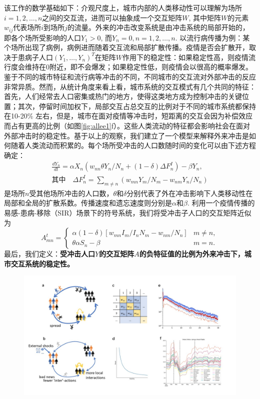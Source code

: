 该工作的数学基础如下：介观尺度上，城市内部的人类移动性可以理解为场所$i = 1,2,\dots,n$之间的交互流，进而可以抽象成一个交互矩阵$W$, 其中矩阵$W$的元素$w_{i j}$代表场所$i$到场所$j$的流量。外来的冲击改变系统是由冲击系统的局部开始的，即各个场所受影响的人口$Y_1>0$, 而$Y_n = 0, n = 1,2,\dots, n$. 以流行病传播为例：某个场所出现了病例，病例进而随着交互流和局部扩散传播。疫情是否会扩散开，取决于患病子人口$(Y_1,\dots,Y_n)^T$在矩阵$W$作用下的稳定性：如果稳定性高，则疫情流行度会维持在$0$附近，即不会爆发；如果稳定性低，则疫情会以很高的概率爆发。鉴于不同的城市特征和流行病等冲击的不同，不同城市的交互流对外部冲击的反应非常异质。然而，从统计角度来看上看，城市系统的交互模式有几个共同的特征：首先，人们经常去人口密集或热门的地方，使得这类地方成为控制冲击的关键位置；其次，停留时间加权下，局部交互占总交互的比例对于不同的城市系统都保持在10-20\% 左右，但是，城市在面对疫情等冲击时，短距离的交互会因为补偿效应而占有更高的比例（如图\ref{fig:allee1}f）。这些人类流动的特征都会影响社会在面对外部冲击时的稳定性。基于以上的观察，我们建立了一个模型来解释外来冲击是如何随着人类流动而积累的。每个场所受冲击的人口数随时间的变化可以由下述方程确定：\begin{equation}
    \begin{split}
        \frac{d Y_n}{d t} = \alpha X_n (w_{nn} \theta Y_n / N_n + (1-\delta) \Delta F_n^I) - \beta Y_n, \\
        \text{其中}\quad \Delta F_n^I = \sum_{m \ne n} (w_{mn} Y_m / N_m - w_{nm} Y_n / N_n)
    \end{split}\label{eq:allee_basic}
\end{equation}是场所$n$受其他场所冲击的人口数，$\theta$和$\delta$分别代表了外在冲击影响下人类移动性在局部和全局的扩散系数。传播速度和遗忘速度则分别是$\alpha$和$\beta$. 利用一个疫情传播的易感-患病-移除（SIR）场景下的符号系统，我们将受冲击子人口的交互矩阵近似为\begin{equation}
    A^t_{m n}=\begin{cases}
\alpha(1-\delta)\left[ w_{m n} I_{m} / I_{n}N_{m} - w_{n m} / N_{n}\right] & m \neq n, \\
\theta \alpha S_{n}-\beta & m=n.
\end{cases}
\end{equation}最后，我们定义：\textbf{受冲击人口$Y$的交互矩阵$A$的负特征值的比例为外来冲击下，城市交互系统的稳定性。}\begin{figure}
    \centering
    \includegraphics[width = 0.9\linewidth]{Figs/Figure1.jpg}

\end{figure}

